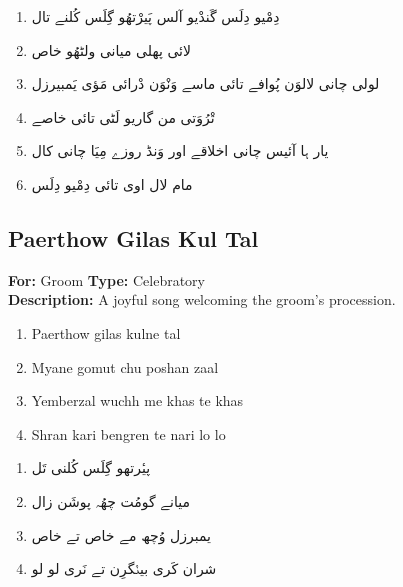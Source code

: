 \documentclass[12pt]{article}
\newcommand{\bigroman}[1]{\fontsize{16pt}{18pt}\selectfont\RaggedRight #1}
\newcommand{\bigarabic}[1]{\fontsize{16pt}{18pt}\selectfont \textarabic{#1}}
\begin{document}
\begin{multicols}{2}
\columnbreak

\begin{RTL}
\begin{enumerate}[leftmargin=*, label=\arabic*., font=\fontsize{16pt}{18pt}\selectfont]
  \item \bigarabic{دِمْیو دِلَس گَندْیو آلس پَیرْتھُو گِلَس کُلنے تال}
  \item \bigarabic{لائی پھلی میانی ولٹھُو خاص}
  \item \bigarabic{لولی چانی لالوَن پُوافے تائی ماسے وَنْوَن دْرائی مَؤی یَمبیرزل}
  \item \bigarabic{تْرُوَتی من گاریو لَٹی تائی خاصے}
  \item \bigarabic{یار ہا آئیس چانی اخلاقے اور وَنڈ روزے مِیَا چانی کال}
  \item \bigarabic{مام لال اوی تائی دِمْیو دِلَس}
\end{enumerate}
\end{RTL}
\end{multicols}


\subsection*{Paerthow Gilas Kul Tal}
\textbf{For:} Groom \quad \textbf{Type:} Celebratory\\
\textbf{Description:} A joyful song welcoming the groom's procession.

\begin{multicols}{2}
\begin{enumerate}[leftmargin=*, label=\arabic*., font=\fontsize{16pt}{18pt}\selectfont]
  \item \bigroman{Paerthow gilas kulne tal}
  \item \bigroman{Myane gomut chu poshan zaal}
  \item \bigroman{Yemberzal wuchh me khas te khas}
  \item \bigroman{Shran kari bengren te nari lo lo}
\end{enumerate}

\columnbreak

\begin{RTL}
\begin{enumerate}[leftmargin=*, label=\arabic*., font=\fontsize{16pt}{18pt}\selectfont]
  \item \bigarabic{پیٔرتھو گِلَس کُلنی تَل}
  \item \bigarabic{میانے گومُت چھُہ پوشَن زال}
  \item \bigarabic{یمبرزل وُچھ مے خاص تے خاص}
  \item \bigarabic{شران کَری بینٛگرِن تے نَری لو لو}
\end{enumerate}
\end{RTL}
\end{multicols}
\end{document}
